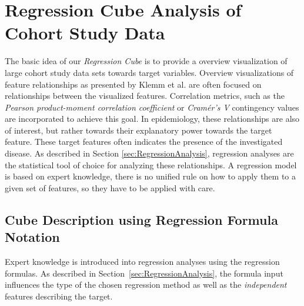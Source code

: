 \documentclass[journal]{style/vgtc} 			          %
\begin{document}
\section{Regression Cube Analysis of Cohort Study Data}
The basic idea of our \emph{Regression Cube} is to provide a overview visualization of large cohort study data sets towards target variables.
Overview visualizations of feature relationships as presented by Klemm et al. \cite{Klemm2014VIS} are often focused on relationships between the visualized features.
Correlation metrics, such as the \emph{Pearson product-moment correlation coefficient} or \emph{Cram\'{e}r's V} contingency values are incorporated to achieve this goal.
In epidemiology, these relationships are also of interest, but rather towards their explanatory power towards the target feature.
These target features often indicates the presence of the investigated disease.
As described in Section \ref{sec:RegressionAnalysis}, regression analyses are the statistical tool of choice for analyzing these relationships.
A regression model is based on expert knowledge, there is no unified rule on how to apply them to a given set of features, so they have to be applied with care.
\subsection{Cube Description using Regression Formula Notation}
Expert knowledge is introduced into regression analyses using the regression formulas.
As described in Section~\ref{sec:RegressionAnalysis}, the formula input influences the type of the chosen regression method as well as the \emph{independent} features describing the target.
\end{document}
